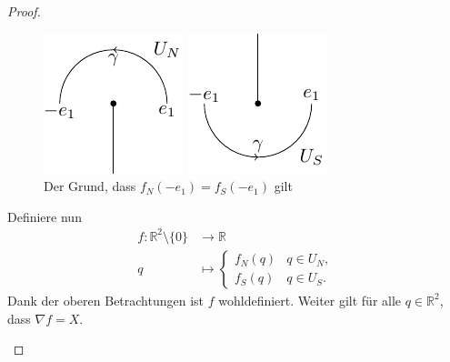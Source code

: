 \documentclass[../main.tex]{subfiles}
\begin{document}
\begin{proof}
\begin{enumerate}[(i)]
      \begin{figure}[htb] 
        \centering
        \begin{minipage}{0.30\textwidth}
          \centering
          \includegraphics{figures/e1tominuse1}
        \end{minipage}%
        \begin{minipage}{0.30\textwidth}
          \centering
          \includegraphics{figures/minuse1toe1}
        \end{minipage}%
        \caption{Der Grund, dass $f_N(-e_1) = 
        f_S(-e_1)$ gilt}%
        \label{fig:e1tominuse1}
      \end{figure}

      Definiere nun
      \begin{align*}
        f \colon \mathbb{R}^2 \setminus \{0\} & \to \mathbb{R} \\
        q & \mapsto 
        \begin{cases}
          f_N(q) & q \in U_N, \\
          f_S(q) & q \in U_S.
        \end{cases}
      \end{align*}
      Dank der oberen Betrachtungen
      ist $f$ wohldefiniert.
      Weiter gilt für alle
      $q \in \mathbb{R}^2$, dass
      $\nabla f = X$.


\end{enumerate}
\end{proof}
\end{document}
